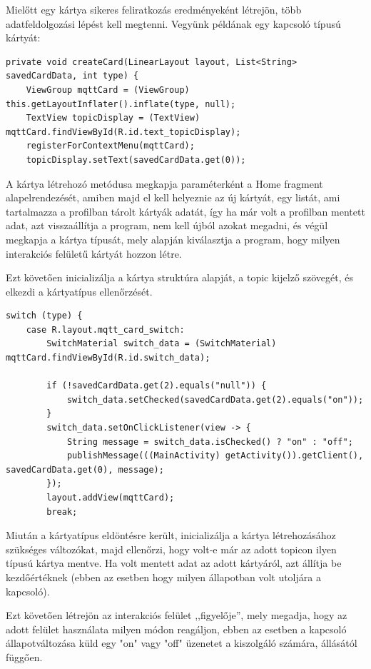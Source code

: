 \documentclass[
]{thesis-ekf}
\theoremstyle{definition}
\theoremstyle{remark}
\begin{document}
Mielőtt egy kártya sikeres feliratkozás eredményeként létrejön, több adatfeldolgozási lépést kell megtenni. 
Vegyünk példának egy kapcsoló típusú kártyát:


\lstset{language=Java}  
\begin{lstlisting}[frame=single]
private void createCard(LinearLayout layout, List<String> savedCardData, int type) {
    ViewGroup mqttCard = (ViewGroup) this.getLayoutInflater().inflate(type, null);
    TextView topicDisplay = (TextView) mqttCard.findViewById(R.id.text_topicDisplay);
    registerForContextMenu(mqttCard);
    topicDisplay.setText(savedCardData.get(0));
\end{lstlisting}

A kártya létrehozó metódusa megkapja paraméterként a Home fragment alapelrendezését, amiben majd el kell
helyeznie az új kártyát, egy listát, ami tartalmazza a profilban tárolt kártyák adatát, így ha már
volt a profilban mentett adat, azt visszaállítja a program, nem kell újból azokat megadni, és végül
megkapja a kártya típusát, mely alapján kiválasztja a program, hogy milyen interakciós felületű kártyát
hozzon létre.

Ezt követően inicializálja a kártya struktúra alapját, a topic kijelző szövegét, és elkezdi a kártyatípus ellenőrzését.

\lstset{language=Java}  
\begin{lstlisting}[frame=single]
switch (type) {
	case R.layout.mqtt_card_switch:
		SwitchMaterial switch_data = (SwitchMaterial) mqttCard.findViewById(R.id.switch_data);

		if (!savedCardData.get(2).equals("null")) {
			switch_data.setChecked(savedCardData.get(2).equals("on"));
		}
		switch_data.setOnClickListener(view -> {
			String message = switch_data.isChecked() ? "on" : "off";
			publishMessage(((MainActivity) getActivity()).getClient(), savedCardData.get(0), message);
		});
		layout.addView(mqttCard);
		break;
\end{lstlisting}

Miután a kártyatípus eldöntésre került, inicializálja a kártya létrehozásához szükséges változókat, majd ellenőrzi, hogy volt-e már az adott topicon ilyen típusú kártya mentve.
Ha volt mentett adat az adott kártyáról, azt állítja be kezdőértéknek
(ebben az esetben hogy milyen állapotban volt utoljára a kapcsoló).

Ezt követően létrejön az interakciós felület ,,figyelője'', mely megadja, hogy az adott felület használata
milyen módon reagáljon, ebben az esetben a kapcsoló állapotváltozása küld egy "on" vagy "off" üzenetet a
kiszolgáló számára, állásától függően.
\end{document}
